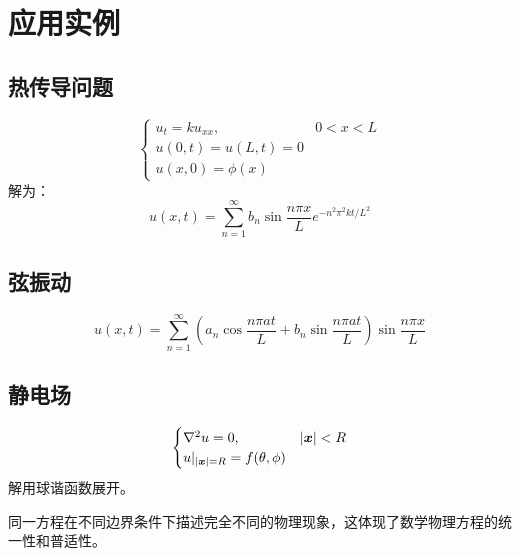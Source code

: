 ﻿\chapter{应用实例}

\section{热传导问题}

\begin{theorem}[有界杆的热传导]
\[
\begin{cases}
u_t=ku_{xx},&0<x<L\\
u(0,t)=u(L,t)=0\\
u(x,0)=\phi(x)
\end{cases}
\]
解为：
\[
u(x,t)=\sum_{n=1}^{\infty}b_n\sin\frac{n\pi x}{L}e^{-n^2\pi^2kt/L^2}
\]
\end{theorem}

\section{弦振动}

\begin{theorem}[固定端点的弦振动]
\[
u(x,t)=\sum_{n=1}^{\infty}\left(a_n\cos\frac{n\pi at}{L}+b_n\sin\frac{n\pi at}{L}\right)\sin\frac{n\pi x}{L}
\]
\end{theorem}

\section{静电场}

\begin{theorem}[球内 Dirichlet 问题]
\[
\begin{cases}
\nabla^2 u=0,&|\boldsymbol{x}|<R\\
u|_{|\boldsymbol{x}|=R}=f(\theta,\phi)
\end{cases}
\]
解用球谐函数展开。
\end{theorem}

\begin{remark}
同一方程在不同边界条件下描述完全不同的物理现象，这体现了数学物理方程的统一性和普适性。
\end{remark}
